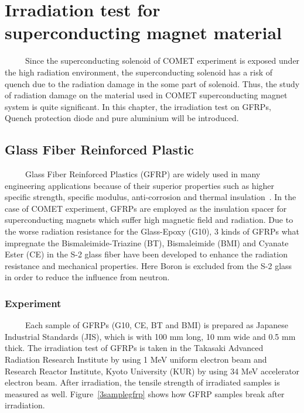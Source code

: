 \chapter{Irradiation test for superconducting magnet material}
~~~~~Since the superconducting solenoid of COMET experiment is exposed under the high radiation environment, the superconducting solenoid has a risk of quench due to the radiation damage in the some part of solenoid.
Thus, the study of radiation damage on the material used in COMET superconducting magnet system is quite significant.
In this chapter, the irradiation test on GFRPs, Quench protection diode and pure aluminium will be introduced.

 \section{Glass Fiber Reinforced Plastic}
~~~~~Glass Fiber Reinforced Plastics (GFRP) are widely used in many engineering applications because of their superior properties such as higher specific strength, specific modulus, anti-corrosion and thermal insulation~\cite{gfrp}.
In the case of COMET experiment, GFRPs are employed as the insulation spacer for superconducting magnets which suffer high magnetic field and radiation.
Due to the worse radiation resistance for the Glass-Epoxy (G10), 3 kinds of GFRPs what impregnate the Bismaleimide-Triazine (BT), Bismaleimide (BMI) and Cyanate Ester (CE) in the S-2 glass fiber have been developed to enhance the radiation resistance and mechanical properties.
Here Boron is excluded from the S-2 glass in order to reduce the influence from neutron.

 \subsection{Experiment}
~~~~~Each sample of GFRPs (G10, CE, BT and BMI) is prepared as Japanese Industrial Standards (JIS), which is with 100 mm long, 10 mm wide and 0.5 mm thick.
The irradiation test of GFRPs is taken in the Takasaki Advanced Radiation Research Institute by using 1 MeV uniform electron beam and Research Reactor Institute, Kyoto University (KUR) by using 34 MeV accelerator electron beam.
After irradiation, the tensile strength of irradiated samples is measured as well.
Figure~\ref{3samplegfrp} shows how GFRP samples break after irradiation.

